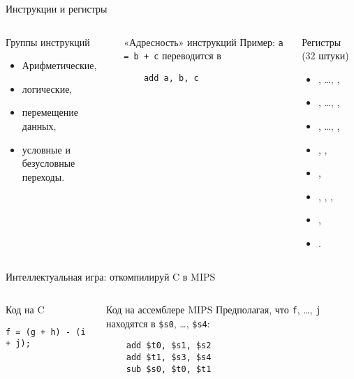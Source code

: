 \begin{frame}[fragile]{Инструкции и регистры}

\begin{columns}
    \column{6.1cm}
\pause
\begin{block}{Группы инструкций}
\begin{itemize}
    \item Арифметические,
    \item логические,
    \item перемещение данных,
    \item условные и безусловные переходы.
\end{itemize}
\end{block}

\pause

\begin{block}{«Адресность» инструкций}
Пример: \texttt{a = b + c} переводится в
\begin{verbatim}
    add a, b, c
\end{verbatim}
\end{block}


\pause
    \column{4.5cm}
\begin{block}{Регистры (32 штуки)}
\begin{itemize}[<+->]
    \item {}, …, ,
    \item {}, …, ,
    \item {}, …, ,
    \item {}, ,
    \item {},
    \item {}, , ,
    \item {},
    \item {}.
\end{itemize}
\end{block}
\end{columns}
\end{frame}

\begin{frame}[fragile]{Интеллектуальная игра: откомпилируй C в MIPS}

\pause
\begin{columns}
    \column{5.5cm}
\begin{block}{Код на C}
\begin{verbatim}
f = (g + h) - (i + j);\end{verbatim}
\end{block}

    \column{5.5cm}
\begin{block}{Код на ассемблере MIPS}
Предполагая, что \texttt{f}, …, \texttt{j} находятся в \texttt{\$s0}, …, \texttt{\$s4}:
\pause
\begin{verbatim}
    add $t0, $s1, $s2
    add $t1, $s3, $s4
    sub $s0, $t0, $t1
\end{verbatim}
\end{block}
\end{columns}
\end{frame}

